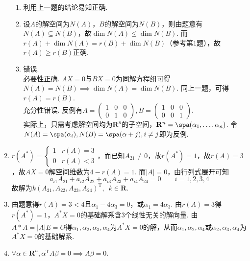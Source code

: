 \begin{enumerate}
\begin{enumerate}
              \item 利用上一题的结论易知正确.

              \item 设$A$的解空间为$N(A)$，$B$的解空间为$N(B)$，则由题意有$N(A)\subseteq N(B)$，故$\dim{N(A)}\leqslant \dim{N(B)}$. 而$r(A)+\dim{N(A)}=r(B)+\dim{N(B)}$（参考第1题），故$r(A)\geqslant r(B)$正确.

              \item 错误.\\
                    必要性正确. $AX=0$与$BX=0$为同解方程组可得$N(A)=N(B)\implies\dim{N(A)}=\dim{N(B)}$. 同上一题，可得$r(A)=r(B)$.\\
                    充分性错误. 反例有$A=\begin{pmatrix}
                            1 & 0 & 0 \\
                            0 & 1 & 0
                        \end{pmatrix}, B=\begin{pmatrix}
                            1 & 0 & 0 \\
                            0 & 0 & 1
                        \end{pmatrix}$.\\
                    实际上，只需考虑解空间均为$\mathbf{R}^n$的子空间，$\mathbf{R}^n=\spa(\alpha_1,\ldots,\alpha_n)$. 令$N(A)=\spa(\alpha_i), N(B)=\spa(\alpha+j),i\neq j$即为反例.
          \end{enumerate}

    \item $r(A^*)=
              \begin{cases}
                  1 & r(A)=3 \\
                  0 & r(A)<3
              \end{cases}$，而已知$A_{21}\neq 0$，故$r(A^*)=1$，故$r(A)=3$，故$AX = 0$解空间维数为$4-r(A)=1$. 而$|A|=0$，由行列式展开可知
          \[ a_{i1}A_{21}+a_{i2}A_{22}+a_{i3}A_{23}+a_{i4}A_{24}=0 \qquad i=1,2,3,4 \]
          故解为$k(A_{21},A_{22},A_{23},A_{24})^\mathrm{T},\enspace k\in \mathbf{R}$.

    \item 由题意得$r(A)=3<4$且$\alpha_1-4\alpha_3=0$，或$\alpha_1=4\alpha_3$. 由$r(A)=3$得$r(A^*)=1$，$A^*X=0$的基础解系含3个线性无关的解向量. 由$A*A=|A|E=O$得$\alpha_1,\alpha_2,\alpha_3,\alpha_4$为$A^*X=0$的解，从而$\alpha_1,\alpha_2,\alpha_4$或$\alpha_2,\alpha_3,\alpha_4$为$A^*X=0$的基础解系.

    \item $\forall \alpha \in \mathbf{R}^n, \alpha^\mathrm{T}A\beta =0\implies A\beta =0$.


\end{enumerate}
